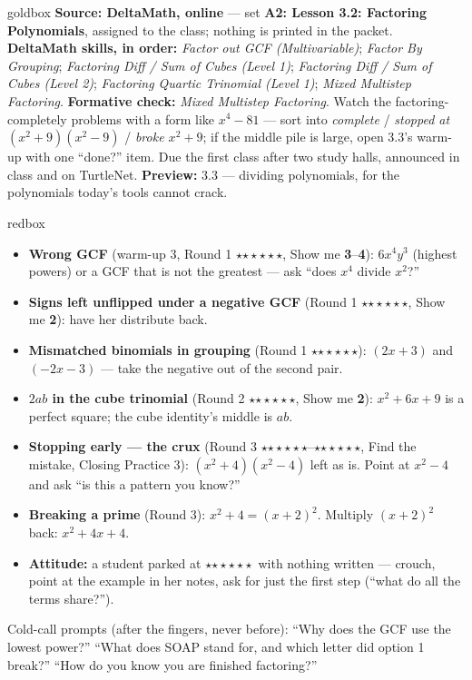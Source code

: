 \documentclass[10pt]{article}
\newcommand{\rung}[1]{{\color{goldacc}\ifcase#1\or$\star$\or$\star\star$\or$\star\star\star$\fi}}
\begin{document}
\boxguard
\begin{skillbox}{goldbox}
\textbf{Source: DeltaMath, online} --- set \textbf{A2: Lesson 3.2: Factoring Polynomials},
assigned to the class; nothing is printed in the packet. \textbf{DeltaMath skills, in order:} \emph{Factor out GCF (Multivariable)}; \emph{Factor By Grouping}; \emph{Factoring Diff / Sum of Cubes (Level 1)}; \emph{Factoring Diff / Sum of Cubes (Level 2)}; \emph{Factoring Quartic Trinomial (Level 1)}; \emph{Mixed Multistep Factoring}. \textbf{Formative check:} \emph{Mixed Multistep Factoring}. Watch the factoring-completely problems with a
form like $x^4-81$ --- sort into \emph{complete} / \emph{stopped at $(x^2+9)(x^2-9)$} /
\emph{broke $x^2+9$}; if the middle pile is large, open 3.3's warm-up with one ``done?''
item. Due the first class after two study halls, announced in class and on TurtleNet.
\textbf{Preview:} 3.3 --- dividing polynomials, for the polynomials today's tools cannot crack.
\end{skillbox}

\boxguard
\begin{skillbox}{redbox}
\begin{itemize}[leftmargin=1.2em, nosep]
  \item \textbf{Wrong GCF} (warm-up 3, Round 1 \rung1, Show me \textbf{3}--\textbf{4}): $6x^4y^3$ (highest powers) or a GCF that is not the greatest ---
        ask ``does $x^4$ divide $x^2$?''
  \item \textbf{Signs left unflipped under a negative GCF} (Round 1 \rung2, Show me
        \textbf{2}): have her distribute back.
  \item \textbf{Mismatched binomials in grouping} (Round 1 \rung3): $(2x+3)$ and $(-2x-3)$ ---
        take the negative out of the second pair.
  \item \textbf{$2ab$ in the cube trinomial} (Round 2 \rung2, Show me \textbf{2}): $x^2+6x+9$ is a perfect square; the cube identity's middle is $ab$.
  \item \textbf{Stopping early --- the crux} (Round 3 \rung1--\rung2, Find the mistake,
        Closing Practice 3): $(x^2+4)(x^2-4)$ left as is. Point at
        $x^2-4$ and ask ``is this a pattern you know?''
  \item \textbf{Breaking a prime} (Round 3): $x^2+4=(x+2)^2$. Multiply
        $(x+2)^2$ back: $x^2+4x+4$.
  \item \textbf{Attitude:} a student parked at \rung1\ with nothing written --- crouch, point at
        the example in her notes, ask for just the first step (``what do all the terms
        share?'').
\end{itemize}
Cold-call prompts (after the fingers, never before): ``Why does the GCF use the lowest power?''
``What does SOAP stand for, and which letter did option 1 break?'' ``How do you know you are
finished factoring?''
\end{skillbox}
\end{document}
